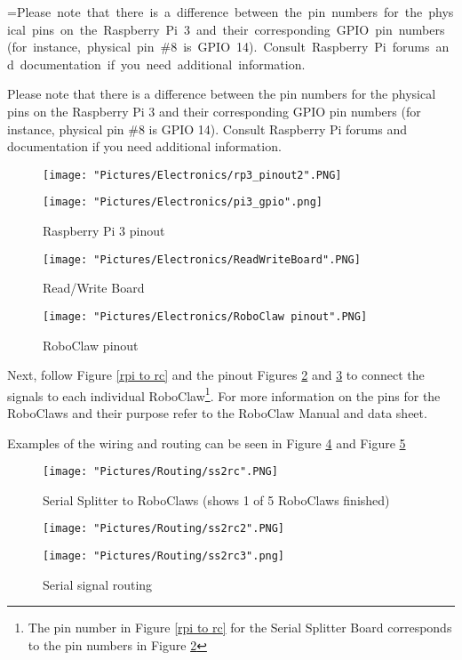 \documentclass[12pt]{article}
\makeatletter
\newcommand{\mybox}[1]{%
  \setbox0=\hbox{#1}%
  \setlength{\@tempdima}{\dimexpr\wd0+13pt}%
  \begin{tcolorbox}[colframe=mycolor,boxrule=0.5pt,arc=4pt,
      left=6pt,right=6pt,top=6pt,bottom=6pt,boxsep=0pt,width=0.95\textwidth]
    #1
  \end{tcolorbox}
}
\makeatother
\begin{document}
\mybox{Please note that there is a difference between the pin numbers for the physical pins on the Raspberry Pi 3 and their  corresponding GPIO pin numbers (for instance, physical pin \#8 is GPIO 14). Consult Raspberry Pi forums and documentation if you need additional information.}


\begin{figure}[H]
 	\centering
  	\begin{minipage}[b]{0.35\textwidth}
		\texttt{[image: "Pictures/Electronics/rp3\_pinout2".PNG]}
  	\end{minipage}
  	\hfill
  	\begin{minipage}[b]{0.45\textwidth}
    		\texttt{[image: "Pictures/Electronics/pi3\_gpio".png]}
  	\end{minipage}
	\caption{Raspberry Pi 3 pinout}
	\label{RPi 3 pinout}
\end{figure}

\begin{figure}[H]
 	\centering
	\texttt{[image: "Pictures/Electronics/ReadWriteBoard".PNG]}
 	\caption{Read/Write Board}
	\label{Read/Write Board}
\end{figure}

\begin{figure}[H]
 	\centering
	\texttt{[image: "Pictures/Electronics/RoboClaw pinout".PNG]}
 	\caption{RoboClaw pinout}
	\label{RC pinout}
\end{figure}

Next, follow Figure \ref{rpi to rc} and the pinout Figures \ref{Read/Write Board} and \ref{RC pinout} to connect the signals to each individual RoboClaw\footnote{The pin number in Figure \ref{rpi to rc} for the Serial Splitter Board corresponds to the pin numbers in Figure \ref{Read/Write Board}}. For more information on the pins for the RoboClaws and their purpose refer to the RoboClaw Manual and data sheet. 

\noindent Examples of the wiring and routing can be seen in Figure \ref{ss2rc1} and Figure \ref{ss2rc2}

\begin{figure}[H]
 	\centering
	\texttt{[image: "Pictures/Routing/ss2rc".PNG]}
 	\caption{Serial Splitter to RoboClaws (shows 1 of 5 RoboClaws finished)}
	\label{ss2rc1}
\end{figure}

\begin{figure}[H]
 	\centering
  	\begin{minipage}[b]{0.50\textwidth}
		\texttt{[image: "Pictures/Routing/ss2rc2".PNG]}
  	\end{minipage}
  	\hfill
  	\begin{minipage}[b]{0.40\textwidth}
    		\texttt{[image: "Pictures/Routing/ss2rc3".png]}
  	\end{minipage}
	\caption{Serial signal routing}
	\label{ss2rc2}
\end{figure}
\end{document}
